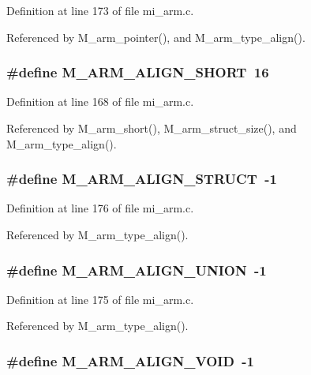 Definition at line 173 of file mi\_\-arm.c.

Referenced by M\_\-arm\_\-pointer(), and M\_\-arm\_\-type\_\-align().
\subsubsection{\setlength{\rightskip}{0pt plus 5cm}\#define M\_\-ARM\_\-ALIGN\_\-SHORT~16}\label{mi__arm_8c_f3c2fb1b019127d36c431e137f38aa74}




Definition at line 168 of file mi\_\-arm.c.

Referenced by M\_\-arm\_\-short(), M\_\-arm\_\-struct\_\-size(), and M\_\-arm\_\-type\_\-align().
\subsubsection{\setlength{\rightskip}{0pt plus 5cm}\#define M\_\-ARM\_\-ALIGN\_\-STRUCT~-1}\label{mi__arm_8c_0eb683d02d62a3784f442e32d7ddb510}




Definition at line 176 of file mi\_\-arm.c.

Referenced by M\_\-arm\_\-type\_\-align().
\subsubsection{\setlength{\rightskip}{0pt plus 5cm}\#define M\_\-ARM\_\-ALIGN\_\-UNION~-1}\label{mi__arm_8c_7e85450a6e47cbcec7478dfc9d0de550}




Definition at line 175 of file mi\_\-arm.c.

Referenced by M\_\-arm\_\-type\_\-align().
\subsubsection{\setlength{\rightskip}{0pt plus 5cm}\#define M\_\-ARM\_\-ALIGN\_\-VOID~-1}\label{mi__arm_8c_c8257c08c4d04def62e79d8e48d2f789}




